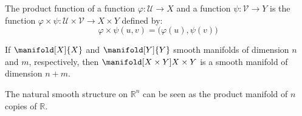     \begin{definition}
        The product function of a function
        $\varphi:\mathcal{U}\rightarrow{X}$ and a function
        $\psi:\mathcal{V}\rightarrow{Y}$ is the function
        $\varphi\times\psi:%
         \mathcal{U}\times\mathcal{V}\rightarrow{X}\times{Y}$ defined by:
         \begin{equation*}
            \varphi\times\psi(u,v)=\big(\varphi(u),\psi(v)\big)
         \end{equation*}
    \end{definition}
    \begin{theorem}
        If $\manifold[X]{X}$ and $\manifold[Y]{Y}$ smooth manifolds of
        dimension $n$ and $m$, respectively, then
        $\manifold[X\times{Y}]{X\times{Y}}$ is a smooth manifold of
        dimension $n+m$.
    \end{theorem}
    The natural smooth structure on $\mathbb{R}^{n}$ can be seen as the
    product manifold of $n$ copies of $\mathbb{R}$.
